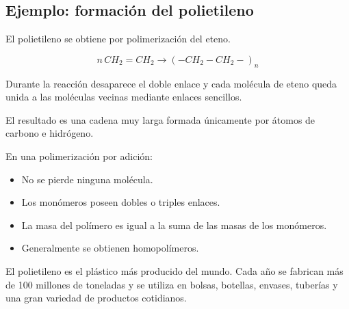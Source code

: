 \subsection{Ejemplo: formación del polietileno}

El polietileno se obtiene por polimerización del eteno.

\[
n\,CH_2=CH_2
\longrightarrow
(-CH_2-CH_2-)_n
\]

Durante la reacción desaparece el doble enlace y cada molécula de eteno queda unida
a las moléculas vecinas mediante enlaces sencillos.

El resultado es una cadena muy larga formada únicamente por átomos de carbono e
hidrógeno.


\begin{tcolorbox}[
title=Recuerda,
colback=blue!5,
colframe=blue!70!black]

En una polimerización por adición:

\begin{itemize}

\item No se pierde ninguna molécula.

\item Los monómeros poseen dobles o triples enlaces.

\item La masa del polímero es igual a la suma de las masas de los monómeros.

\item Generalmente se obtienen homopolímeros.

\end{itemize}

\end{tcolorbox}


\begin{tcolorbox}[
title=Curiosidad,
colback=green!5,
colframe=green!60!black]

El polietileno es el plástico más producido del mundo. Cada año se fabrican más de
100 millones de toneladas y se utiliza en bolsas, botellas, envases, tuberías y una
gran variedad de productos cotidianos.

\end{tcolorbox}


